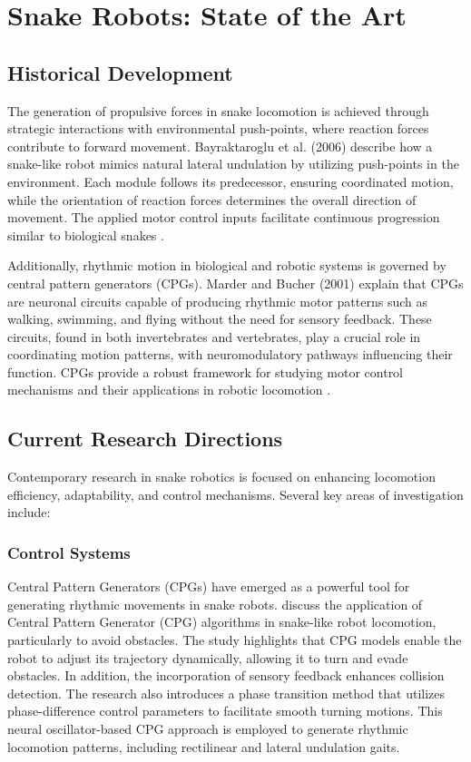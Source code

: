 \documentclass[12pt,a4paper]{report}
\begin{document}
\section{Snake Robots: State of the Art}

\subsection{Historical Development}
The generation of propulsive forces in snake locomotion is achieved through strategic interactions with environmental push-points, where reaction forces contribute to forward movement. Bayraktaroglu et al. (2006) describe how a snake-like robot mimics natural lateral undulation by utilizing push-points in the environment. Each module follows its predecessor, ensuring coordinated motion, while the orientation of reaction forces determines the overall direction of movement. The applied motor control inputs facilitate continuous progression similar to biological snakes \textcite{Bayraktaroglu2006}.

Additionally, rhythmic motion in biological and robotic systems is governed by central pattern generators (CPGs). Marder and Bucher (2001) explain that CPGs are neuronal circuits capable of producing rhythmic motor patterns such as walking, swimming, and flying without the need for sensory feedback. These circuits, found in both invertebrates and vertebrates, play a crucial role in coordinating motion patterns, with neuromodulatory pathways influencing their function. CPGs provide a robust framework for studying motor control mechanisms and their applications in robotic locomotion \textcite{MARDER2001R986}.


\subsection{Current Research Directions}
Contemporary research in snake robotics is focused on enhancing locomotion efficiency, adaptability, and control mechanisms. Several key areas of investigation include:

\subsubsection{Control Systems}
Central Pattern Generators (CPGs) have emerged as a powerful tool for generating rhythmic movements in snake robots.
\textcite{Seeja2022} discuss the application of Central Pattern Generator (CPG) algorithms in snake-like robot locomotion, particularly to avoid obstacles. The study highlights that CPG models enable the robot to adjust its trajectory dynamically, allowing it to turn and evade obstacles. In addition, the incorporation of sensory feedback enhances collision detection. The research also introduces a phase transition method that utilizes phase-difference control parameters to facilitate smooth turning motions. This neural oscillator-based CPG approach is employed to generate rhythmic locomotion patterns, including rectilinear and lateral undulation gaits.
\end{document}

